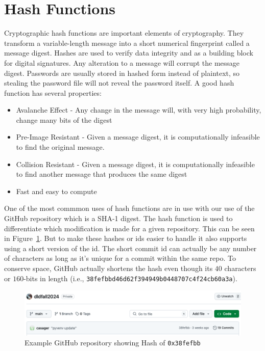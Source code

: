 \documentclass{article}
\begin{document}
\section{Hash Functions}

Cryptographic hash functions are important elements of
cryptography. They transform a variable-length message into a short
numerical fingerprint called a message digest. Hashes are used to
verify data integrity and as a building block for digital
signatures. Any alteration to a message will corrupt the message
digest. Passwords are usually stored in hashed form instead of
plaintext, so stealing the password file will not reveal the password
itself. A good hash function has several properties:
\begin{itemize}
\item Avalanche Effect - Any change in the message will, with very high probability, change 
  many bits of the digest
\item Pre-Image Resistant - Given a message digest, it is
  computationally infeasible to find the original message.
\item Collision Resistant - Given a message digest, it is
  computationally infeasible to find
  another message that produces the same digest
\item Fast and easy to compute
\end{itemize}

One of the most commmon uses of hash functions are in use with our use
of the GitHub repository which is a SHA-1 digest.
The hash function is used to differentiate
which modification is made for a given repository.  This can be seen
in Figure~\ref{sha.fig}.
But to make these hashes or ids easier to handle it also supports using a
short version of the id. The short commit id can actually be any
number of characters as long as it's unique for a commit within the
same repo.
To conserve space, GitHub actually shortens
the hash even though its $40$ characters or $160$-bits in length (i.e.,
\verb!38fefbbd46d62f394949b0448707c4f24cb60a3a!). 
\begin{figure}
  \centering
  \includegraphics[scale=0.5]{github.png}
  \caption{Example GitHub repository showing Hash of \texttt{0x38fefbb}}
  \label{sha.fig}
\end{figure}
\end{document}
